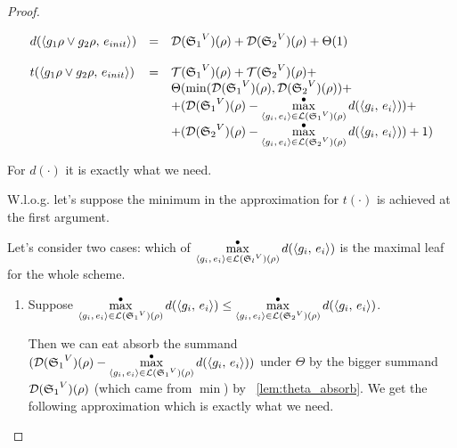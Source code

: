 \begin{proof}
\begin{enumerate}
\begin{enumerate}
	 \[ \begin{array}{lcl}
	d(\langle g_1 \rho \lor g_2 \rho ,\, e_{init} \rangle) &=& \mathcal{D}({\mathfrak{S}_1}^{V})(\rho) + \mathcal{D}({\mathfrak{S}_2}^{V})(\rho) + \Theta(1) \\
	\\
	t(\langle g_1 \rho \lor g_2 \rho ,\, e_{init} \rangle) &=& \mathcal{T}({\mathfrak{S}_1}^{V})(\rho) + \mathcal{T}({\mathfrak{S}_2}^{V})(\rho) + \\
	& & \Theta(\min(\mathcal{D}({\mathfrak{S}_1}^{V})(\rho), \mathcal{D}({\mathfrak{S}_2}^{V})(\rho)) + \\
	& & + (\mathcal{D}({\mathfrak{S}_1}^{V})(\rho) - \max^{\bullet}\limits_{\langle g_i ,\, e_i \rangle \in \mathcal{L}({\mathfrak{S}_1}^{V})(\rho)} d(\langle g_i ,\, e_i \rangle)) + \\
	& & + (\mathcal{D}({\mathfrak{S}_2}^{V})(\rho) - \max^{\bullet}\limits_{\langle g_i ,\, e_i \rangle \in \mathcal{L}({\mathfrak{S}_2}^{V})(\rho)} d(\langle g_i ,\, e_i \rangle)) + 1) \\
	\end{array} \]
	
	For $d(\cdot)$ it is exactly what we need. 
   
   	W.l.o.g. let's suppose the minimum in the approximation for $t(\cdot)$ is achieved at the first argument.
   
   	Let's consider two cases: which of $\max^{\bullet}\limits_{\langle g_i ,\, e_i \rangle \in \mathcal{L}({\mathfrak{S}_l}^{V})(\rho)} d(\langle g_i ,\, e_i \rangle)$ is the maximal leaf for the whole scheme.
   
   		\begin{enumerate}
   		\item Suppose $\max^{\bullet}\limits_{\langle g_i ,\, e_i \rangle \in \mathcal{L}({\mathfrak{S}_1}^{V})(\rho)} d(\langle g_i ,\, e_i \rangle) \le \max^{\bullet}\limits_{\langle g_i ,\, e_i \rangle \in \mathcal{L}({\mathfrak{S}_2}^{V})(\rho)} d(\langle g_i ,\, e_i \rangle)$.
   		
   		Then we can eat absorb the summand $(\mathcal{D}({\mathfrak{S}_1}^{V})(\rho) - \max^{\bullet}\limits_{\langle g_i ,\, e_i \rangle \in \mathcal{L}({\mathfrak{S}_1}^{V})(\rho)} d(\langle g_i ,\, e_i \rangle))$ under $\Theta$ by the bigger summand $\mathcal{D}({\mathfrak{S}_1}^{V})(\rho)$ (which came from $\min$) by \lemmaword~\ref{lem:theta_absorb}. We get the following approximation which is exactly what we need.
   		

\end{enumerate}
\end{enumerate}
\end{enumerate}
\end{proof}

